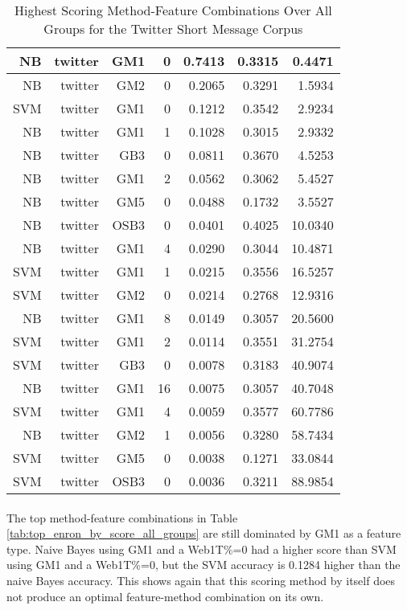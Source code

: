 \begin{table}[htbp!]
\begin{center}
\begin{tabular}{ | r | r | r | r | r | r | r | }
		NB	& twitter	& GM1	& 0	& 0.7413	& 0.3315	& 0.4471\\ \hline 
		NB	& twitter	& GM2	& 0	& 0.2065	& 0.3291	& 1.5934\\ \hline 
		SVM	& twitter	& GM1	& 0	& 0.1212	& 0.3542	& 2.9234\\ \hline 
		NB	& twitter	& GM1	& 1	& 0.1028	& 0.3015	& 2.9332\\ \hline 
		NB	& twitter	& GB3	& 0	& 0.0811	& 0.3670	& 4.5253\\ \hline 
		NB	& twitter	& GM1	& 2	& 0.0562	& 0.3062	& 5.4527\\ \hline 
		NB	& twitter	& GM5	& 0	& 0.0488	& 0.1732	& 3.5527\\ \hline 
		NB	& twitter	& OSB3	& 0	& 0.0401	& 0.4025	& 10.0340\\ \hline 
		NB	& twitter	& GM1	& 4	& 0.0290	& 0.3044	& 10.4871\\ \hline 
		SVM	& twitter	& GM1	& 1	& 0.0215	& 0.3556	& 16.5257\\ \hline 
		SVM	& twitter	& GM2	& 0	& 0.0214	& 0.2768	& 12.9316\\ \hline 
		NB	& twitter	& GM1	& 8	& 0.0149	& 0.3057	& 20.5600\\ \hline 
		SVM	& twitter	& GM1	& 2	& 0.0114	& 0.3551	& 31.2754\\ \hline 
		SVM	& twitter	& GB3	& 0	& 0.0078	& 0.3183	& 40.9074\\ \hline 
		NB	& twitter	& GM1	& 16	& 0.0075	& 0.3057	& 40.7048\\ \hline 
		SVM	& twitter	& GM1	& 4	& 0.0059	& 0.3577	& 60.7786\\ \hline 
		NB	& twitter	& GM2	& 1	& 0.0056	& 0.3280	& 58.7434\\ \hline 
		SVM	& twitter	& GM5	& 0	& 0.0038	& 0.1271	& 33.0844\\ \hline 
		SVM	& twitter	& OSB3	& 0	& 0.0036	& 0.3211	& 88.9854\\ \hline 
		\end{tabular}
		\caption{Highest Scoring Method-Feature Combinations Over All Groups for the Twitter Short Message Corpus}
		\label{tab:top_twitter_by_score_all_groups}
	\end{center}
\end{table}

\paragraph*{} The top method-feature combinations in Table \ref{tab:top_enron_by_score_all_groups} are still dominated by GM1 as a feature type.  Naive Bayes using GM1 and a Web1T\%=0 had a higher score than SVM using GM1 and a Web1T\%=0, but the SVM accuracy is 0.1284 higher than the naive Bayes accuracy.  This shows again that this scoring method by itself does not produce an optimal feature-method combination on its own.

